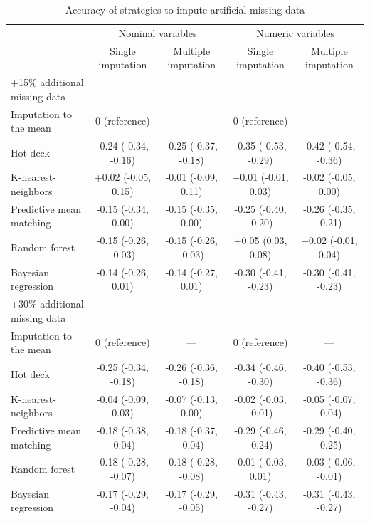 \documentclass{article}
\begin{document}
\begin{table} 
 \caption{Accuracy of strategies to impute artificial missing data} 
\label{tbl_impute_accuracy} 
 
\begin{tabular}{lcccc}
\toprule
& \multicolumn{2}{c}{Nominal variables} & \multicolumn{2}{c}{Numeric variables} \\ 
 \cmidrule(lr){2-3}\cmidrule(lr){4-5}
 & Single imputation & Multiple imputation & Single imputation & Multiple imputation \\ 
\midrule
\multicolumn{1}{l}{+15\% additional missing data} \\ 
\midrule
Imputation to the mean & 0 (reference) & --- & 0 (reference) & --- \\ 
Hot deck & -0.24 (-0.34, -0.16) & -0.25 (-0.37, -0.18) & -0.35 (-0.53, -0.29) & -0.42 (-0.54, -0.36) \\ 
K-nearest-neighbors & +0.02 (-0.05, 0.15) & -0.01 (-0.09, 0.11) & +0.01 (-0.01, 0.03) & -0.02 (-0.05, 0.00) \\ 
Predictive mean matching & -0.15 (-0.34, 0.00) & -0.15 (-0.35, 0.00) & -0.25 (-0.40, -0.20) & -0.26 (-0.35, -0.21) \\ 
Random forest & -0.15 (-0.26, -0.03) & -0.15 (-0.26, -0.03) & +0.05 (0.03, 0.08) & +0.02 (-0.01, 0.04) \\ 
Bayesian regression & -0.14 (-0.26, 0.01) & -0.14 (-0.27, 0.01) & -0.30 (-0.41, -0.23) & -0.30 (-0.41, -0.23) \\ 
\midrule
\multicolumn{1}{l}{+30\% additional missing data} \\ 
\midrule
Imputation to the mean & 0 (reference) & --- & 0 (reference) & --- \\ 
Hot deck & -0.25 (-0.34, -0.18) & -0.26 (-0.36, -0.18) & -0.34 (-0.46, -0.30) & -0.40 (-0.53, -0.36) \\ 
K-nearest-neighbors & -0.04 (-0.09, 0.03) & -0.07 (-0.13, 0.00) & -0.02 (-0.03, -0.01) & -0.05 (-0.07, -0.04) \\ 
Predictive mean matching & -0.18 (-0.38, -0.04) & -0.18 (-0.37, -0.04) & -0.29 (-0.46, -0.24) & -0.29 (-0.40, -0.25) \\ 
Random forest & -0.18 (-0.28, -0.07) & -0.18 (-0.28, -0.08) & -0.01 (-0.03, 0.01) & -0.03 (-0.06, -0.01) \\ 
Bayesian regression & -0.17 (-0.29, -0.04) & -0.17 (-0.29, -0.05) & -0.31 (-0.43, -0.27) & -0.31 (-0.43, -0.27) \\ 
\bottomrule
\end{tabular} 
 \end{table}
\end{document}
